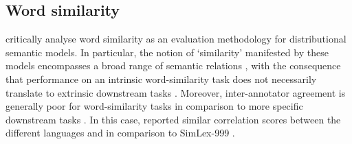 \subsection{Word similarity}

\textcite{Batchkarov2016} critically analyse word similarity as an evaluation
methodology for distributional semantic models.
In particular, the notion of `similarity' manifested by these models encompasses a
broad range of semantic relations \parencite[e.g.,][2]{Pado2003}, with the consequence
that performance on an intrinsic word-similarity task does not necessarily translate to
extrinsic downstream tasks \parencite[7-8]{Batchkarov2016}.
Moreover, inter-annotator agreement is generally poor for word-similarity tasks in
comparison to more specific downstream tasks \parencite[8-9]{Batchkarov2016}.
In this case, \textcites[8]{Armendariz2020}[42]{Armendariz2020a} reported similar
correlation scores between the different languages and in comparison to SimLex-999
\parencite[678-680]{Hill2015}.
